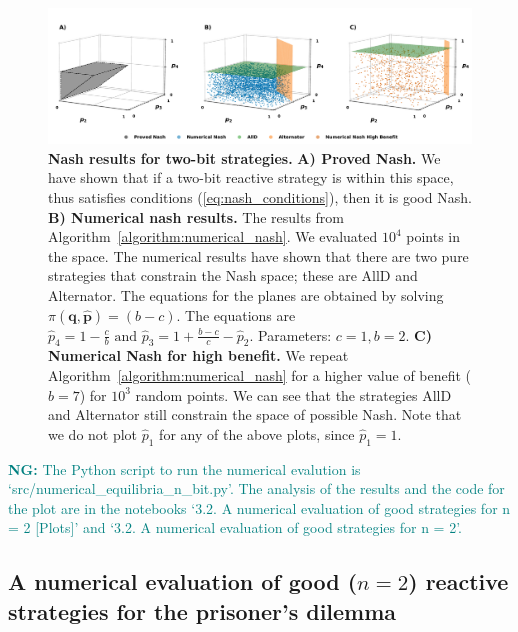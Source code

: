 \documentclass{article}
\theoremstyle{definition}
\newcommand{\nikoleta}[1]{\textcolor{teal}{{\bf NG:} #1}}
\begin{document}
\begin{figure}[!htbp]
     \centering
     \includegraphics[width=\textwidth]{static/two_bit_reactive_numerical_results.pdf}
     \caption{\textbf{Nash results for two-bit strategies.}
     \textbf{A) Proved Nash.} We have shown that if a two-bit reactive
     strategy is within this space, thus satisfies conditions
     (\ref{eq:nash_conditions}), then it is good Nash. \textbf{B) Numerical nash
     results.} The results from
     Algorithm~\ref{algorithm:numerical_nash}. We evaluated \(10 ^ 4\) points in
     the space. The numerical results have shown that there are two pure
     strategies that constrain the Nash space; these are AllD and Alternator.
     The equations for the planes are obtained by solving
     \(\pi(\mathbf{q}, \mathbf{\hat{p}}) = (b\!-\!c)\). The equations are
     \(\hat{p}_4 = 1 - \frac{c}{b} \text{ and }  \hat{p}_3 = 1 + \frac{b\!-\!c}{c} - \hat{p}_2\).
      Parameters: \(c=1, b=2\). \textbf{C) Numerical Nash for high benefit.} We repeat
     Algorithm~\ref{algorithm:numerical_nash} for a higher value of benefit
     (\(b=7\)) for \(10 ^ 3\) random points. We can see that the strategies AllD
     and Alternator still constrain the space of possible Nash. Note that we do
     not plot \(\hat{p}_1\) for any of the above plots, since \(\hat{p}_1=1\).}\label{fig:two_bit_reactive_nash_results}
\end{figure}

\nikoleta{The Python script to run the numerical evalution is
`src/numerical\_equilibria\_n\_bit.py'. The analysis of the results and the code
for the plot are in the notebooks `3.2. A numerical evaluation of good
strategies for n = 2 [Plots]' and `3.2. A numerical evaluation of good
strategies for n = 2'.}

\subsection{A numerical evaluation of good (\(n=2\)) reactive strategies for the prisoner's dilemma}\label{section:good_strategies_numerically_pd}
\end{document}
